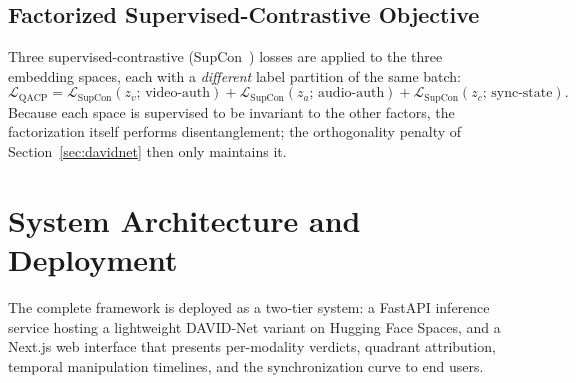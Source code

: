 \subsection{Factorized Supervised-Contrastive Objective}
Three supervised-contrastive (SupCon~\cite{khosla2020supcon}) losses are applied
to the three embedding spaces, each with a \emph{different} label partition of
the same batch:
\begin{equation}
\mathcal{L}_{\text{QACP}} =
  \mathcal{L}_{\text{SupCon}}(z_v;\, \text{video-auth}) +
  \mathcal{L}_{\text{SupCon}}(z_a;\, \text{audio-auth}) +
  \mathcal{L}_{\text{SupCon}}(z_c;\, \text{sync-state}).
\end{equation}
Because each space is supervised to be invariant to the other factors, the
factorization itself performs disentanglement; the orthogonality penalty of
Section~\ref{sec:davidnet} then only maintains it.

\section{System Architecture and Deployment}
The complete framework is deployed as a two-tier system: a FastAPI inference
service hosting a lightweight DAVID-Net variant on Hugging Face Spaces, and a
Next.js web interface that presents per-modality verdicts, quadrant attribution,
temporal manipulation timelines, and the synchronization curve to end users.
